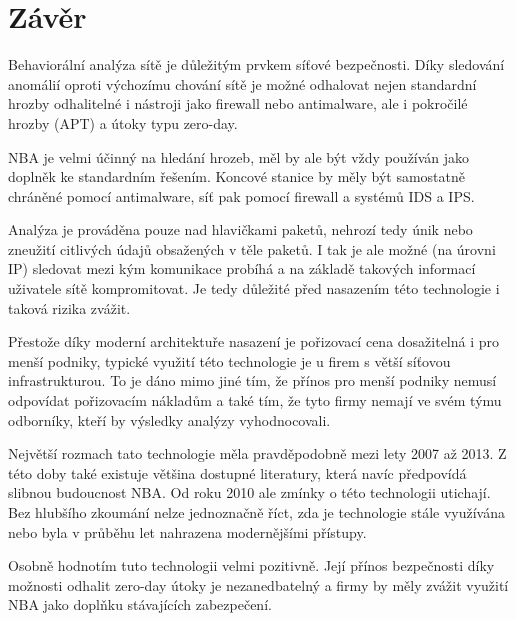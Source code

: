 \section{Závěr}

Behaviorální analýza sítě je důležitým prvkem síťové bezpečnosti.
Díky sledování anomálií oproti výchozímu chování sítě je možné odhalovat nejen standardní hrozby odhalitelné i nástroji jako firewall nebo antimalware, ale i pokročilé hrozby (APT) a útoky typu zero-day.

NBA je velmi účinný na hledání hrozeb, měl by ale být vždy používán jako doplněk ke standardním řešením.
Koncové stanice by měly být samostatně chráněné pomocí antimalware, síť pak pomocí firewall a systémů IDS a IPS.

Analýza je prováděna pouze nad hlavičkami paketů, nehrozí tedy únik nebo zneužití citlivých údajů obsažených v těle paketů.
I tak je ale možné (na úrovni IP) sledovat mezi kým komunikace probíhá a na základě takových informací uživatele sítě kompromitovat.
Je tedy důležité před nasazením této technologie i taková rizika zvážit.

Přestože díky moderní architektuře nasazení je pořizovací cena dosažitelná i pro menší podniky, typické využití této technologie je u firem s větší síťovou infrastrukturou.
To je dáno mimo jiné tím, že přínos pro menší podniky nemusí odpovídat pořizovacím nákladům a také tím, že tyto firmy nemají ve svém týmu odborníky, kteří by výsledky analýzy vyhodnocovali.

Největší rozmach tato technologie měla pravděpodobně mezi lety 2007 až 2013.
Z této doby také existuje většina dostupné literatury, která navíc předpovídá slibnou budoucnost NBA.
Od roku 2010 ale zmínky o této technologii utichají.
Bez hlubšího zkoumání nelze jednoznačně říct, zda je technologie stále využívána nebo byla v průběhu let nahrazena modernějšími přístupy.

Osobně hodnotím tuto technologii velmi pozitivně.
Její přínos bezpečnosti díky možnosti odhalit zero-day útoky je nezanedbatelný a firmy by měly zvážit využití NBA jako doplňku stávajících zabezpečení.
